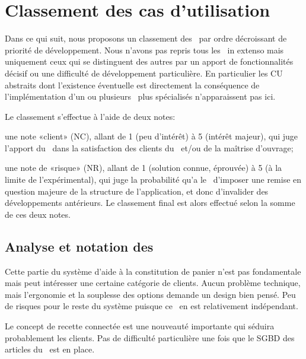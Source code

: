 \section{Classement des cas d'utilisation}
Dans ce qui suit, nous proposons un classement des \cu\ par ordre décroissant de priorité de développement.
Nous n'avons pas repris tous les \cu\ in extenso mais uniquement ceux qui se distinguent des autres par un apport de fonctionnalités décisif ou une difficulté de développement particulière. 
En particulier les CU abstraits dont l'existence éventuelle est directement la conséquence de l'implémentation d'un ou plusieurs \cu\ plus spécialisés n'apparaissent pas ici.\par
Le classement s'effectue à l'aide de deux notes:
\startitemize[n]
\item une note «client» (NC), allant de 1 (peu d'intérêt) à 5 (intérêt majeur), qui juge l'apport du \cu\ dans la satisfaction des clients du \fm\ et/ou de la maîtrise d'ouvrage;
\item une note de «risque» (NR), allant de 1 (solution connue, éprouvée) à 5 (à la limite de l'expérimental), qui juge la probabilité qu'a le \cu\ d'imposer une remise en question majeure de la structure de l'application, et donc d'invalider des développements antérieurs.
\stopitemize
Le classement final est alors effectué selon la somme de ces deux notes.

\subsection{Analyse et notation des \cu}

\def\NC#1{\sym{\bf NC~#1}}%
\def\NR#1{\sym{\bf NR~#1}}%
\def\startnote{\startitemize[packed][distance=2em]}%
\let\stopnote\stopitemize

\startnote
\NC2 Cette partie du système d'aide à la constitution de panier n'est pas fondamentale mais peut intéresser une certaine catégorie de clients.
\NR2 Aucun problème technique, mais l'ergonomie et la souplesse des options demande un design bien pensé.
Peu de risques pour le reste du système puisque ce \cu\ en est relativement indépendant.
\stopnote

\startnote
\NC4 Le concept de recette connectée est une nouveauté importante qui séduira probablement les clients.
\NR2 Pas de difficulté particulière une fois que le SGBD des articles du \fm\ est en place.
\stopnote

